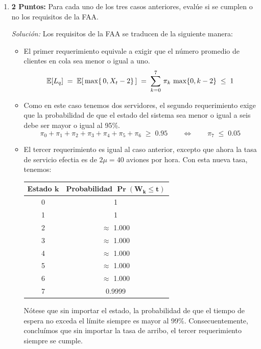 \documentclass[ a4paper, twoside, 11pt]{article}
\begin{document}
\begin{problem}
\begin{enumerate}[label=\textbf{\alph*)}]
\item \textbf{2 Puntos:} Para cada uno de los tres casos anteriores, eval\'ue si se cumplen o no los requisitos de la FAA. 

\emph{Soluci\'on:} Los requisitos de la FAA se traducen de la siguiente manera: 
\begin{itemize}
\item El primer requerimiento equivale a exigir que el n\'umero promedio de clientes en cola sea menor o igual a uno. \Iec
\[
\mathbb{E}[L_q] \; = \; \mathbb{E}[ \, \max \{ \, 0, X_t - 2 \} \, ]
\; = \; \sum_{k=0}^7 \, \pi_k \, \max \{ 0, k-2 \} \; \leq \; 1
\]
\item Como en este caso tenemos dos servidores, el segundo requerimiento exige que la probabilidad de que el estado del sistema sea menor o igual a seis debe ser mayor o igual al 95\%. \Iec
\[
\pi_0 + \pi_1 + \pi_2 + \pi_3 + \pi_4 + \pi_5 + \pi_6 \; \geq \; 0.95
\qquad
\Longleftrightarrow
\qquad
\pi_7 \; \leq \; 0.05
\]
\item El tercer requerimiento es igual al caso anterior, excepto que ahora la tasa de servicio efectia es de $2 \mu = 40$ aviones por hora. Con esta nueva tasa, tenemos: 
\begin{table}[H]
\centering
\begin{tabular}{|c|c|}
\hline
\textbf{Estado} $\boldsymbol{k}$ & \textbf{Probabilidad} $\boldsymbol{ \Pr( W_k \leq t)}$ \\ \hline
0 & 1  \\ \hline
1 & 1  \\ \hline
2 & $\approx$ 1.000 \\ \hline
3 & $\approx$ 1.000 \\ \hline
4 & $\approx$ 1.000 \\ \hline
5 & $\approx$ 1.000  \\ \hline
6 & $\approx$ 1.000  \\ \hline
7 & 0.9999  \\ \hline
\end{tabular}
\end{table}
N\'otese que sin importar el estado, la probabilidad de que el tiempo de espera no exceda el l\'imite siempre es mayor al 99\%. Consecuentemente, conclu\'imos que sin importar la tasa de arribo, el tercer requerimiento siempre se cumple. 
\end{itemize}


\end{enumerate}
\end{problem}
\end{document}
